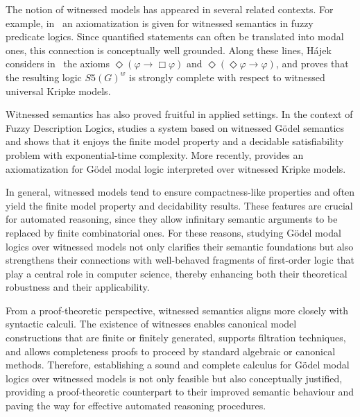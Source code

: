 The notion of witnessed models has appeared in several related
contexts. For example, in~\cite{HC2006} an axiomatization is given for
witnessed semantics in fuzzy predicate logics. Since quantified
statements can often be translated into modal ones, this connection is
conceptually well grounded. Along these lines, H\'ajek considers
in~\cite{HajekS5} the axioms $\Diamond(\varphi \to \Box \varphi)$ and
$\Diamond(\Diamond \varphi \to \varphi)$, and proves that the resulting
logic $S5(G)^w$ is strongly complete with respect to witnessed
universal Kripke models.

Witnessed semantics has also proved fruitful in applied settings. In
the context of Fuzzy Description Logics, \cite{BDP2014} studies a
system based on witnessed G\"odel semantics and shows that it enjoys
the finite model property and a decidable satisfiability problem with
exponential-time complexity. More recently, \cite{RV26} provides an
axiomatization for  G\"odel modal logic interpreted over witnessed
Kripke models.

In general, witnessed models tend to ensure compactness-like properties and
often yield the finite model property and decidability
results. These features are crucial for automated reasoning,
since they allow infinitary semantic arguments to be replaced by
finite combinatorial ones. For these reasons, studying G\"odel modal
logics over witnessed models not only clarifies their semantic
foundations but also strengthens their connections with well-behaved
fragments of first-order logic that play a central role in computer
science, thereby enhancing both their theoretical robustness and their
applicability.

From a proof-theoretic perspective, witnessed semantics aligns more
closely with syntactic calculi.
The existence of witnesses enables canonical model constructions that
are finite or finitely generated, supports filtration techniques, and
allows completeness proofs to proceed by standard algebraic or
canonical methods. Therefore, establishing a sound and complete
calculus for G\"odel modal logics over witnessed models is not only
feasible but also conceptually justified, providing a proof-theoretic
counterpart to their improved semantic behaviour and paving the way for
effective automated reasoning procedures.


